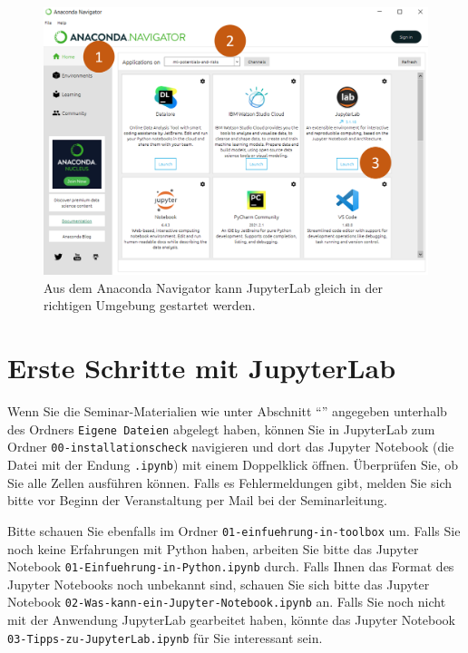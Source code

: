 \documentclass{tufte-handout}
\begin{document}
\begin{figure}[h]
  \includegraphics{anaconda-navigator-jupyterlab--mit-reihenfolge}
  \caption{Aus dem Anaconda Navigator kann JupyterLab gleich in der richtigen Umgebung gestartet werden.}%
\label{fig:start-jupyterlab}
\end{figure}

\section{Erste Schritte mit JupyterLab}

Wenn Sie die Seminar-Materialien wie unter Abschnitt \enquote{} angegeben unterhalb des Ordners \texttt{Eigene Dateien} abgelegt haben, 
können Sie in JupyterLab zum Ordner 
\texttt{00-installationscheck}
navigieren und dort das Jupyter Notebook (die Datei mit der Endung \texttt{.ipynb}) mit einem Doppelklick öffnen.
Überprüfen Sie, ob Sie alle Zellen ausführen können.
Falls es Fehlermeldungen gibt, melden Sie sich bitte vor Beginn der Veranstaltung per Mail bei der Seminarleitung.

Bitte schauen Sie ebenfalls im Ordner
\texttt{01-einfuehrung-in-toolbox}
um.
Falls Sie noch keine Erfahrungen mit Python haben, arbeiten Sie bitte das Jupyter Notebook
\texttt{01-Einfuehrung-in-Python.ipynb}
durch.
Falls Ihnen das Format des Jupyter Notebooks noch unbekannt sind, schauen Sie sich bitte das Jupyter Notebook
\texttt{02-Was-kann-ein-Jupyter-Notebook.ipynb}
an.
Falls Sie noch nicht mit der Anwendung JupyterLab gearbeitet haben, könnte das Jupyter Notebook \texttt{03-Tipps-zu-JupyterLab.ipynb} für Sie interessant sein.
\end{document}
